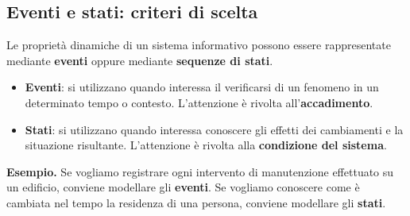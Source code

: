 \subsection{Eventi e stati: criteri di scelta}
Le proprietà dinamiche di un sistema informativo possono essere
rappresentate mediante \textbf{eventi} oppure mediante
\textbf{sequenze di stati}.
\begin{itemize}
    \item \textbf{Eventi}: si utilizzano quando interessa il
    verificarsi di un fenomeno in un determinato tempo o contesto.
    L'attenzione è rivolta all'\textbf{accadimento}.

    \item \textbf{Stati}: si utilizzano quando interessa conoscere
    gli effetti dei cambiamenti e la situazione risultante.
    L'attenzione è rivolta alla \textbf{condizione del sistema}.
\end{itemize}
\noindent
\textcolor{verdeEsempio}{\textbf{Esempio. }}
Se vogliamo registrare ogni intervento di manutenzione effettuato
su un edificio, conviene modellare gli \textbf{eventi}.
Se vogliamo conoscere come è cambiata nel tempo la residenza
di una persona, conviene modellare gli \textbf{stati}.
